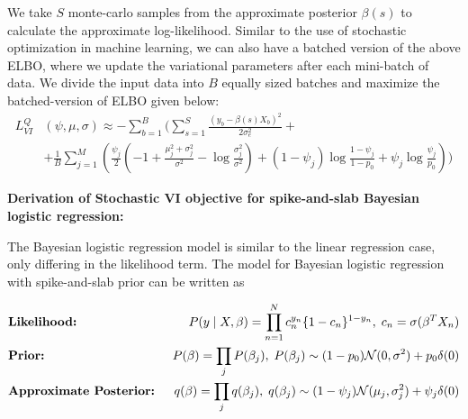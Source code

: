 %
We take $S$ monte-carlo samples from the approximate posterior $\beta(s)$ to calculate the approximate log-likelihood.
%
Similar to the use of stochastic optimization in machine learning, we can also have a batched version of the above ELBO, where we update the variational parameters after each mini-batch of data.
%
We divide the input data into $B$ equally sized batches and maximize the batched-version of ELBO given below:
\begin{align}
    L^{Q}_{VI}&(\psi, \mu, \sigma) \approx - \sum\limits^{B}_{b=1} \Bigg( \sum\limits^{S}_{s=1} \frac{(y_b - \beta(s) X_b)^2}{2 \sigma_e^2} + \nonumber \\
    &+ \frac{1}{B}\sum\limits^{M}_{j=1} \left(  \frac{\psi_j}{2}\left(-1 + \frac{\mu_j^2 + \sigma_j^2}{\sigma^2} - \log \frac{\sigma_j^2}{\sigma^2} \right) + (1-\psi_j)\log\frac{1 - \psi_j}{1 - p_0} + \psi_j\log\frac{\psi_j}{p_0} \right) \Bigg)
    \label{elbo-loss}
\end{align}


%
\vspace{3mm}
\noindent \textbf{Derivation of Stochastic VI objective for spike-and-slab Bayesian logistic regression:}
\vspace{2mm}
%

%
The Bayesian logistic regression model is similar to the linear regression case, only differing in the likelihood term.
%
The model for Bayesian logistic regression with spike-and-slab prior can be written as
%

\begin{align}
    &\text{\textbf{Likelihood:} } &P(y \mid X, \beta) = \prod_{n=1}^{N} c_n^{y_n} \{1 - c_n\}^{1-y_n}, \hspace{1mm} c_n = \sigma(\beta^T X_n) \nonumber \\
    &\text{\textbf{Prior:} } &P(\beta) = \prod_j P(\beta_j), \hspace{1mm} P(\beta_j) \sim (1-p_0)\mathcal{N} (0, \sigma ^ 2) + p_0 \delta(0) \nonumber \\
    &\text{\textbf{Approximate Posterior:} } &q(\beta) = \prod_j q(\beta_j), \hspace{1mm} q(\beta_j) \sim (1-\psi_j)\mathcal{N}(\mu_j, \sigma^2_j) + \psi_j \delta(0)
    \label{spike-and-slab-model3-rep}
\end{align}

